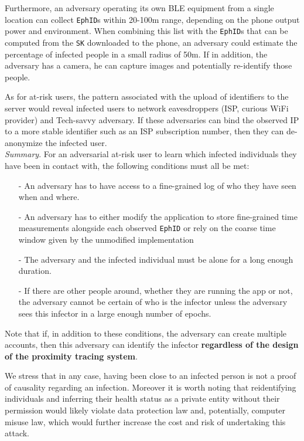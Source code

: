 \documentclass[12pt,a4paper]{article}
\begin{document}
Furthermore, an adversary operating its own BLE equipment from a single location can
collect \texttt{EphID}s within 20-100m range, depending on the phone output power and
environment. When combining this list with the \texttt{EphID}s that can be computed from the \texttt{SK} downloaded to the phone, an adversary could estimate the percentage of infected people in a small radius of 50m. If in addition, the adversary has a camera, he can capture images and potentially re-identify those people.

As for at-risk users, the pattern associated with the upload of identifiers to the server would reveal infected users to network eavesdroppers (ISP, curious WiFi provider) and Tech-savvy adversary. If these adversaries can bind the observed IP to a more stable identifier such as an ISP subscription number, then they can de-anonymize the infected user.\\[0.6cm]
\textit{Summary}. For an adversarial at-risk user to learn which infected individuals they have been in contact with, the following conditions must all be met:
\begin{itemize}\itemsep0pt
\item[-] An adversary has to have access to a fine-grained log of who they have seen when
and where.
\item[-] An adversary has to either modify the application to store fine-grained time
measurements alongside each observed \texttt{EphID} or rely on the coarse time window
given by the unmodified implementation 
\item[-] The adversary and the infected individual must be alone for a long enough duration.
\item[-] If there are other people around, whether they are running the app or not, the
adversary cannot be certain of who is the infector unless the adversary sees this
infector in a large enough number of epochs.
\end{itemize}
Note that if, in addition to these conditions, the adversary can create multiple accounts, then this adversary can identify the infector \textbf{regardless of the design of the proximity tracing system}.

We stress that in any case, having been close to an infected person is not a proof of
causality regarding an infection. Moreover it is worth noting that reidentifying individuals and inferring their health status as a private entity without their permission would likely violate data protection law and, potentially, computer misuse law, which would further increase the cost and risk of undertaking this attack.
\end{document}
